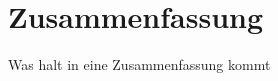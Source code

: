 

\chapter{Zusammenfassung}
\begin{itshape}
Was halt in eine Zusammenfassung kommt
\end{itshape}






